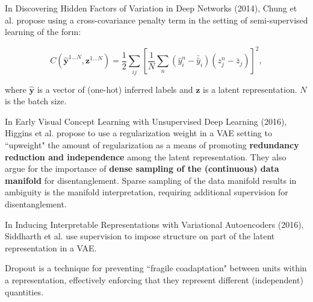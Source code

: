 In Discovering Hidden Factors of Variation in Deep Networks (2014),  Chung et al. propose using a cross-covariance penalty term in the setting of semi-supervised learning of the form:

\begin{equation}
	C(\hat{\mathbf{y}}^{1 \dots N}, \mathbf{z}^{1 \dots N}) = \frac{1}{2} \sum_{ij} \left[ \frac{1}{N} \sum_n (\hat{y}^n_i - \bar{\hat{y}}_i) (z^n_j - \bar{z}_j) \right]^2,
\end{equation}

\noindent where $\hat{\mathbf{y}}$ is a vector of (one-hot) inferred labels and $\mathbf{z}$ is a latent representation. $N$ is the batch size.


In Early Visual Concept Learning with Unsupervised Deep Learning (2016), Higgins et al. propose to use a regularization weight in a VAE setting to ``upweight" the amount of regularization as a means of promoting \textbf{redundancy reduction and independence} among the latent representation. They also argue for the importance of \textbf{dense sampling of the (continuous) data manifold} for disentanglement. Sparse sampling of the data manifold results in ambiguity is the manifold interpretation, requiring additional supervision for disentanglement.

In Inducing Interpretable Representations with Variational Autoencoders (2016), Siddharth et al. use supervision to impose structure on part of the latent representation in a VAE.

Dropout is a technique for preventing ``fragile coadaptation" between units within a representation, effectively enforcing that they represent different (independent) quantities.